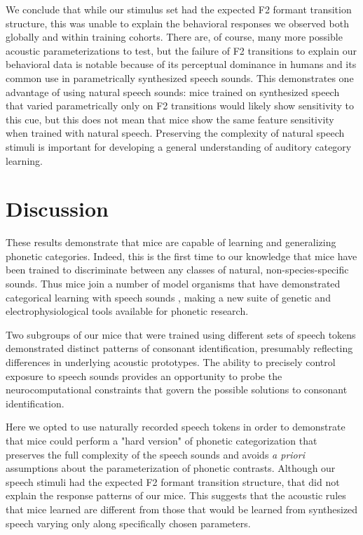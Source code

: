 We conclude that while our stimulus set had the expected F2 formant transition structure, this was unable to explain the behavioral responses we observed both globally and within training cohorts. There are, of course, many more possible acoustic parameterizations to test, but the failure of F2 transitions to explain our behavioral data is notable because of its perceptual dominance in humans and its common use in parametrically synthesized speech sounds. This demonstrates one advantage of using natural speech sounds: mice trained on synthesized speech that varied parametrically only on F2 transitions would likely show sensitivity to this cue, but this does not mean that mice show the same feature sensitivity when trained with natural speech. Preserving the complexity of natural speech stimuli is important for developing a general understanding of auditory category learning.

%
%

\section{Discussion}

These results demonstrate that mice are capable of learning and generalizing phonetic categories. Indeed, this is the first time to our knowledge that mice have been trained to discriminate between any classes of natural, non-species-specific sounds. Thus mice join a number of model organisms that have demonstrated categorical learning with speech sounds \citep{Kluender1987,Lotto1997,Kluender2000,Kuhl1978,Engineer2015,Kuhl1983,Dooling1995}, making a new suite of genetic and electrophysiological tools available for phonetic research.

Two subgroups of our mice that were trained using different sets of speech tokens demonstrated distinct patterns of consonant identification, presumably reflecting differences in underlying acoustic prototypes. The ability to precisely control exposure to speech sounds provides an opportunity to probe the neurocomputational constraints that govern the possible solutions to consonant identification.

Here we opted to use naturally recorded speech tokens in order to demonstrate that mice could perform a "hard version" of phonetic categorization that preserves the full complexity of the speech sounds and avoids \textit{a priori} assumptions about the parameterization of phonetic contrasts. Although our speech stimuli had the expected F2 formant transition structure, that did not explain the response patterns of our mice. This suggests that the acoustic rules that mice learned are different from those that would be learned from synthesized speech varying only along specifically chosen parameters.

